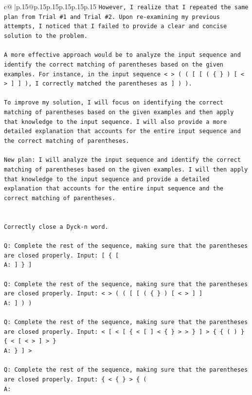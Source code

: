 \documentclass{article}
\begin{document}
{\begin{supertabular}{c@{$\;$}|p{.15\linewidth}@{}p{.15\linewidth}p{.15\linewidth}p{.15\linewidth}p{.15\linewidth}p{.15\linewidth}}
{{{\texttt{However, I realize that I repeated the same plan from Trial \#1 and Trial \#2. Upon re{-}examining my previous attempts, I noticed that I failed to provide a clear and concise solution to the problem. } \\
\\ 
\texttt{A more effective approach would be to analyze the input sequence and identify the correct matching of parentheses based on the given examples. For instance, in the input sequence < > ( ( {[} {[} ( \{ \} ) {[} < > {]} {]} ), I correctly matched the parentheses as {]} ) ). } \\
\\ 
\texttt{To improve my solution, I will focus on identifying the correct matching of parentheses based on the given examples and then apply that knowledge to the input sequence. I will also provide a more detailed explanation that accounts for the entire input sequence and the correct matching of parentheses.} \\
\\ 
\texttt{New plan: I will analyze the input sequence and identify the correct matching of parentheses based on the given examples. I will then apply that knowledge to the input sequence and provide a detailed explanation that accounts for the entire input sequence and the correct matching of parentheses.} \\
\\ 
\\ 
\texttt{Correctly close a Dyck{-}n word.} \\
\\ 
\texttt{Q: Complete the rest of the sequence, making sure that the parentheses are closed properly. Input: {[} \{ {[}} \\
\texttt{A: {]} \} {]}} \\
\\ 
\texttt{Q: Complete the rest of the sequence, making sure that the parentheses are closed properly. Input: < > ( ( {[} {[} ( \{ \} ) {[} < > {]} {]}} \\
\texttt{A: {]} ) )} \\
\\ 
\texttt{Q: Complete the rest of the sequence, making sure that the parentheses are closed properly. Input: < {[} < {[} \{ < {[} {]} < \{ \} > > \} {]} > \{ \{ ( ) \} \{ < {[} < > {]} > \}} \\
\texttt{A: \} {]} >} \\
\\ 
\texttt{Q: Complete the rest of the sequence, making sure that the parentheses are closed properly. Input: \{ < \{ \} > \{ (} \\
\texttt{A:} \\
            }
        }
    }
     \\ \\


\end{supertabular}}
\end{document}
